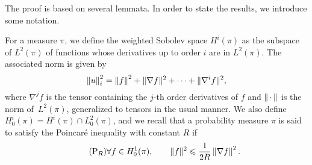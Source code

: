 \documentclass[11pt,a4paper]{article}
\newcommand{\dummy}{\,\cdot\,}
\newcommand{\grad}{\nabla}
\theoremstyle{plain}
\numberwithin{equation}{section}
\renewcommand{\leq}{\leqslant}
\begin{document}
The proof is based on several lemmata.
In order to state the results, we introduce some notation.

For a measure $\pi$, we define the weighted Sobolev space $H^i(\pi)$ as the subspace of $L^2(\pi)$
of functions whose derivatives up to order $i$ are in $L^2(\pi)$.
The associated norm is given by
\[
    \norm{u}_i^2 = \norm{f}^2 + \norm*{\nabla f}^2 + \dotsb + \norm*{\nabla^i f}^2,
\]
where  $\nabla^j f$ is the tensor containing the $j$-th order derivatives of $f$ and $\norm{\dummy}$ is the norm of~$L^2(\pi)$,
generalized to tensors in the usual manner.
We also define $H^{i}_0(\pi) = H^i(\pi) \cap L^2_0(\pi)$,
and we recall that a probability measure $\pi$ is said to satisfy the Poincaré inequality with constant $R$ if
\begin{equation}
    \label{eq:poincare}
    \tag{P$_R$}
    \forall f \in H^1_0(\pi), \qquad
    \norm*{f}^2 \leq \frac{1}{2R} \norm{\grad f}^2.
\end{equation}
\end{document}
